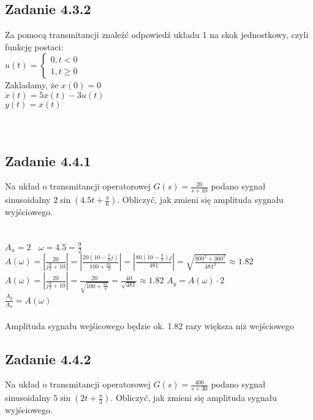 \pagebreak
\subsection*{Zadanie 4.3.2} {\color{darkgray}
	Za pomocą transmitancji znaleźć odpowiedź układu 1 na skok jednostkowy, czyli funkcję postaci:\\
	$u(t)=\begin{cases}0,t<0 \\ 1, t\geqslant 0 \end{cases}$\\
	Zakladamy, że $x(0)=0$\\
	$\dot{x}(t)=5x(t)-3u(t)$\\
	$y(t)=x(t)$\\
}\lineh
\\\\


\pagebreak
\subsection*{Zadanie 4.4.1} {\color{darkgray}
	Na układ o transmitancji operatorowej $G(s)=\frac{20}{s+10}$ podano sygnał sinusoidalny $2\sin(4.5t+\frac \pi 6)$. Obliczyć, jak zmieni się amplituda sygnału wyjściowego.\\
}\lineh
\\\\
$A_u=2 \ \ \ \ \omega = 4.5=\frac 9 2$\\
$A(\omega)=|\frac{20}{j \frac 9 2 + 10}|=|\frac{20(10-\frac 9 2 j)}{100+\frac{81}{4}}|=|\frac{80(10-\frac 9 2)j}{481}|=\sqrt{\frac{800^2+360^2}{481^2}}\approx 1.82$\\
 {\color{lightgray}$A(\omega)=|\frac{20}{j\frac 9 2 +10}|=\frac{20}{\sqrt{100+\frac{81}{4}}}= \frac{40}{\sqrt{481}} \approx 1.82$}
$A_y=A(\omega)\cdot 2$\\
$\frac{A_y}{A_u}=A(\omega)$\\
\\
Amplituda sygnału wejśicowego będzie ok. 1.82 razy większa niż wejściowego\\

\pagebreak
\subsection*{Zadanie 4.4.2} {\color{darkgray}
	Na układ o transmitancji operatorowej $G(s)=\frac{400}{s+30}$ podano sygnał sinusoidalny $5\sin(2t+\frac \pi 3)$. Obliczyć, jak zmieni się amplituda sygnału wyjściowego.\\
}\lineh
\\\\


